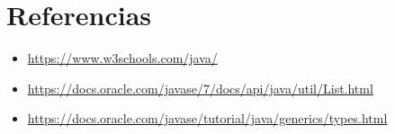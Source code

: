 \documentclass{article}
\begin{document}
\clearpage					

\section{Referencias}
\begin{itemize}			
	\item \url{https://www.w3schools.com/java/}
	\item \url{https://docs.oracle.com/javase/7/docs/api/java/util/List.html}
	\item \url{https://docs.oracle.com/javase/tutorial/java/generics/types.html}

\end{itemize}	

	
%
%
%
			
\end{document}
